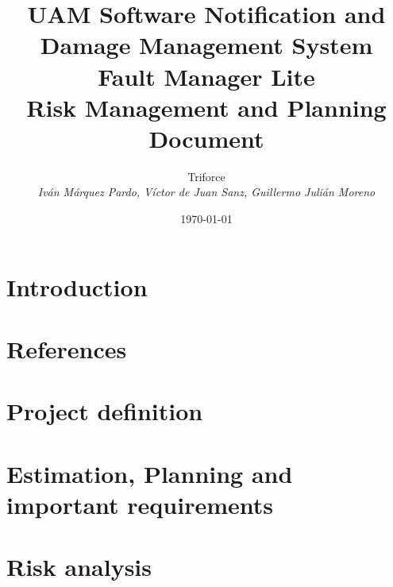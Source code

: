 \documentclass[11pt]{report}
\title{UAM Software Notification and Damage Management System \\ Fault Manager Lite \\ Risk Management and Planning Document}
\date{\today}
\author{{\Large Triforce} \\ \vspace{5pt} \textit{Iván Márquez Pardo, Víctor de Juan Sanz, Guillermo Julián Moreno}}
\begin{document}
\maketitle
\tableofcontents
\newpage
\chapter{Introduction}

\chapter{References}

\chapter{Project definition}

\chapter{Estimation, Planning and important requirements}

\chapter{Risk analysis}


\end{document}
